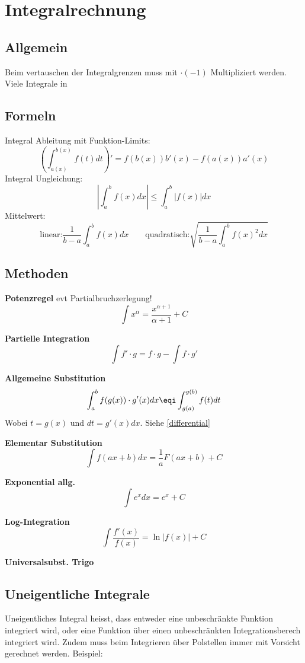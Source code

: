 \section{Integralrechnung}
\subsection{Allgemein}
Beim vertauschen der Integralgrenzen muss mit $\cdot (-1)$ Multipliziert werden. Viele Integrale in 

\subsection{Formeln}
\noindent Integral Ableitung mit Funktion-Limits: \[\left(\int_{a(x)}^{b(x)}f(t)dt\right)' = f(b(x))b'(x) - f(a(x))a'(x)\]
\noindent Integral Ungleichung:
\[\left|\int_{a}^{b}f(x)dx\right| \leq \int_{a}^{b}\left|f(x)\right|dx\]
\noindent Mittelwert:
\[\text{linear:} \frac{1}{b-a}\int_{a}^{b}f(x)dx \qquad \text{quadratisch:} \sqrt{\frac{1}{b-a}\int_{a}^{b}f(x)^2dx}\]


\subsection{Methoden}
\noindent\textbf{Potenzregel} evt Partialbruchzerlegung!
\[ \int x^\alpha = \frac{x^{\alpha  + 1}}{\alpha + 1} + C \]

\noindent\textbf{Partielle Integration}
\[\int f' \cdot g = f \cdot g - \int f \cdot g'\]

\noindent\textbf{Allgemeine Substitution}
\[\int_{a}^{b} f(g(x)) \cdot g'(x)dx \eqi \int_{g(a)}^{g(b)} f(t) dt\]
Wobei $t=g(x)$ und $dt = g'(x)dx$. Siehe \ref{differential}

\noindent\textbf{Elementar Substitution}
\[\int f(ax + b)dx = \frac{1}{a}F(ax+b)+C\]

\noindent\textbf{Exponential allg.}
\[\int e^xdx = e^x + C\]

\noindent\textbf{Log-Integration}
\[\int \frac{f'(x)}{f(x)} = \ln\left|f(x)\right| + C\]

\noindent\textbf{Universalsubst. Trigo}\\

\subsection{Uneigentliche Integrale}
Uneigentliches Integral heisst, dass entweder eine unbeschränkte Funktion integriert wird, oder eine Funktion über einen unbeschränkten Integrationsberech integriert wird. Zudem muss beim Integrieren über Polstellen immer mit Vorsicht gerechnet werden. Beispiel: 

